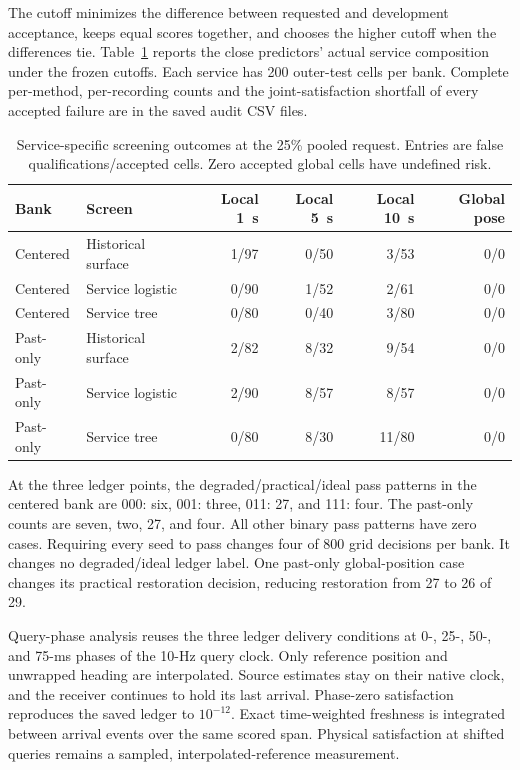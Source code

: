 \documentclass[journal]{IEEEtran}
\begin{document}
The cutoff minimizes the difference between requested and development
acceptance, keeps equal scores together, and chooses the higher cutoff
when the differences tie. Table~\ref{tab:service_screening} reports the
close predictors' actual service composition under the frozen cutoffs.
Each service has 200 outer-test cells per bank. Complete per-method,
per-recording counts and the joint-satisfaction shortfall of every
accepted failure are in the saved audit CSV files.

\begin{table}[t]
\centering
\caption{Service-specific screening outcomes at the 25\% pooled request.
Entries are false qualifications/accepted cells. Zero accepted global
cells have undefined risk.}
\label{tab:service_screening}
\begin{tabular}{llrrrr}
\toprule
Bank & Screen & Local 1~s & Local 5~s & Local 10~s & Global pose\\
\midrule
Centered & Historical surface & 1/97 & 0/50 & 3/53 & 0/0\\
Centered & Service logistic & 0/90 & 1/52 & 2/61 & 0/0\\
Centered & Service tree & 0/80 & 0/40 & 3/80 & 0/0\\
Past-only & Historical surface & 2/82 & 8/32 & 9/54 & 0/0\\
Past-only & Service logistic & 2/90 & 8/57 & 8/57 & 0/0\\
Past-only & Service tree & 0/80 & 8/30 & 11/80 & 0/0\\
\bottomrule
\end{tabular}
\end{table}

At the three ledger points, the degraded/practical/ideal pass patterns
in the centered bank are 000: six, 001: three, 011: 27, and 111: four.
The past-only counts are seven, two, 27, and four. All other binary pass
patterns have zero cases. Requiring every seed to pass changes four of
800 grid decisions per bank. It changes no degraded/ideal ledger label.
One past-only global-position case changes its practical restoration
decision, reducing restoration from 27 to 26 of 29.

Query-phase analysis reuses the three ledger delivery conditions at
0-, 25-, 50-, and 75-ms phases of the 10-Hz query clock. Only reference
position and unwrapped heading are interpolated. Source estimates stay
on their native clock, and the receiver continues to hold its last
arrival. Phase-zero satisfaction reproduces the saved ledger to
$10^{-12}$. Exact time-weighted freshness is integrated between arrival
events over the same scored span. Physical satisfaction at shifted
queries remains a sampled, interpolated-reference measurement.
\end{document}
